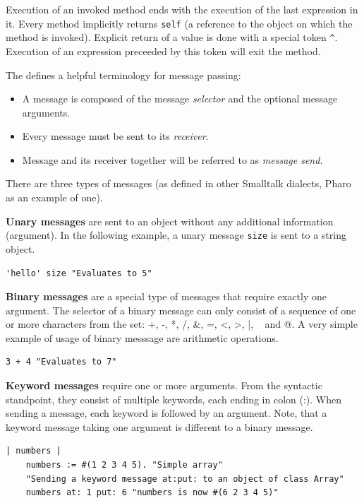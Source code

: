 \documentclass[thesis=M,english]{FITthesis}[2019/12/23]
\begin{document}
Execution of an invoked method ends with the execution of the last expression in it. Every method implicitly
returns \texttt{self} (a reference to the object on which the method is invoked). Explicit return of a value
is done with a special token \texttt{\^}. Execution of an expression preceeded by this token will exit the method.

The \cite{pharo-by-example} defines a helpful terminology for message passing:
\begin{itemize}
	\item A message is composed of the message \textit{selector} and the optional message arguments.
	\item Every message must be sent to its \textit{receiver}.
	\item Message and its receiver together will be referred to as \textit{message send}.
\end{itemize}

There are three types of messages (as defined in other Smalltalk dialects, Pharo as an example of one).

\textbf{Unary messages} are sent to an object without any additional information (argument). In the following
example, a unary message \texttt{size} is sent to a string object.
\begin{lstlisting}[language=Smalltalk]
	'hello' size "Evaluates to 5"
\end{lstlisting}

\textbf{Binary messages} are a special type of messages that require exactly one argument. The selector
of a binary message can only consist of a sequence of one or more characters from the set: +, -, *, /,
\&, =, \textless, \textgreater, |, ~ and @. A very simple example of usage of binary messsage are arithmetic operations.
\begin{lstlisting}[language=Smalltalk]
	3 + 4 "Evaluates to 7"
\end{lstlisting}

\textbf{Keyword messages} require one or more arguments. From the syntactic standpoint, they consist of
multiple keywords, each ending in colon (:). When sending a message, each keyword is followed by an argument.
Note, that a keyword message taking one argument is different to a binary message.
\begin{lstlisting}[language=Smalltalk]
	| numbers |
	numbers := #(1 2 3 4 5). "Simple array"
	"Sending a keyword message at:put: to an object of class Array"
	numbers at: 1 put: 6 "numbers is now #(6 2 3 4 5)"
\end{lstlisting}
\end{document}
